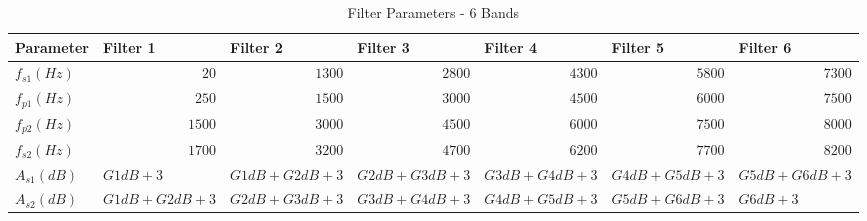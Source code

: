 \documentclass[12pt, onecolumn]{article}
\begin{document}
\begin{appendices}
\begin{table}[htbp]
  \centering
  \caption{Filter Parameters - 6 Bands}
  \begin{adjustbox}{width=0.9\linewidth}
    \begin{tabular}{|l|l|l|l|l|l|l|}
    \hline
    \textbf{Parameter} & \textbf{Filter 1} & \textbf{Filter 2} & \textbf{Filter 3} & \textbf{Filter 4} & \textbf{Filter 5} & \textbf{Filter 6} \\
    \hline
    $f_{s1} (Hz)$   & \multicolumn{1}{r|}{$20$} & \multicolumn{1}{r|}{$1300$} & \multicolumn{1}{r|}{$2800$} & \multicolumn{1}{r|}{$4300$} & \multicolumn{1}{r|}{$5800$} & \multicolumn{1}{r|}{$7300$} \\
    \hline
    $f_{p1} (Hz)$   & \multicolumn{1}{r|}{$250$} & \multicolumn{1}{r|}{$1500$} & \multicolumn{1}{r|}{$3000$} & \multicolumn{1}{r|}{$4500$} & \multicolumn{1}{r|}{$6000$} & \multicolumn{1}{r|}{$7500$} \\
    \hline
    $f_{p2} (Hz)$   & \multicolumn{1}{r|}{$1500$} & \multicolumn{1}{r|}{$3000$} & \multicolumn{1}{r|}{$4500$} & \multicolumn{1}{r|}{$6000$} & \multicolumn{1}{r|}{$7500$} & \multicolumn{1}{r|}{$8000$} \\
    \hline
    $f_{s2} (Hz)$   & \multicolumn{1}{r|}{$1700$} & \multicolumn{1}{r|}{$3200$} & \multicolumn{1}{r|}{$4700$} & \multicolumn{1}{r|}{$6200$} & \multicolumn{1}{r|}{$7700$} & \multicolumn{1}{r|}{$8200$} \\
    \hline
    $A_{s1} (dB)$   & $G1dB + 3$ & $G1dB + G2dB + 3 $& $G2dB + G3dB + 3 $&$ G3dB + G4dB + 3$ &$ G4dB + G5dB + 3$ &$ G5dB + G6dB + 3$ \\
    \hline
    $A_{s2} (dB)$   &$ G1dB + G2dB + 3$ &$ G2dB + G3dB + 3$ & $G3dB + G4dB + 3$ & $G4dB + G5dB + 3$ & $G5dB + G6dB + 3 $& $G6dB + 3$ \\
    \hline
    \end{tabular}%
    \end{adjustbox}
  \label{tab:filtPara6Band}%
\end{table}%



\end{appendices}
\end{document}
